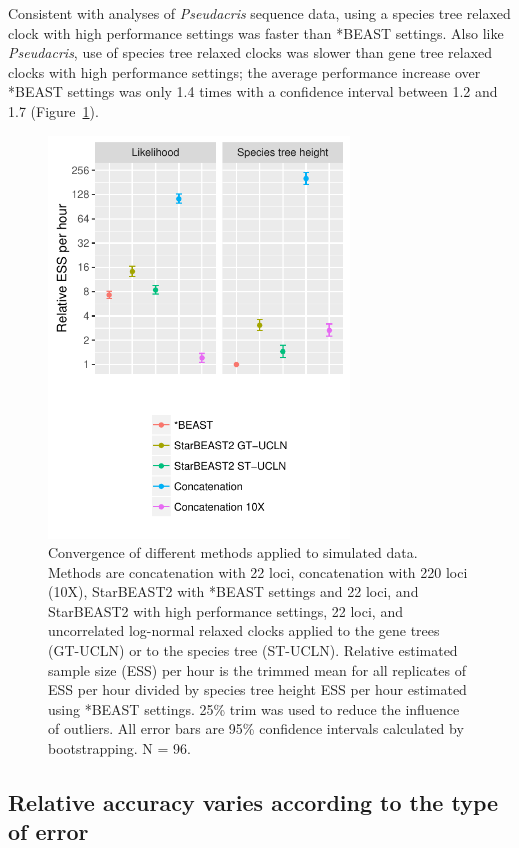 \documentclass[nogrid]{MBE}%
\begin{document}
Consistent with analyses of \textit{Pseudacris} sequence data, using a species
tree relaxed clock with high performance settings was faster than *BEAST settings.
Also like \textit{Pseudacris}, use of species tree relaxed clocks was slower than
gene tree relaxed clocks with high performance settings; the average performance
increase over *BEAST settings was only 1.4 times with a confidence interval
between 1.2 and 1.7 (Figure~\ref{fig:simulatedEssPerHour}).

\begin{figure}[htb!]
\centering
\includegraphics[width=8cm]{multiple_ess_per_hour.pdf}
\caption
{Convergence of different methods applied to simulated data. Methods are
concatenation with 22 loci, concatenation with 220 loci (10X), StarBEAST2 with
*BEAST settings and 22 loci, and StarBEAST2 with high performance settings, 22 loci,
and uncorrelated log-normal relaxed clocks applied to the gene trees (GT-UCLN) or
to the species tree (ST-UCLN). Relative estimated sample size (ESS) per hour is the trimmed mean for all replicates of
ESS per hour divided by species tree height ESS per hour estimated using *BEAST
settings. 25\% trim was used to reduce the influence of
outliers. All error bars are 95\% confidence intervals calculated by
bootstrapping. N = 96.}
\label{fig:simulatedEssPerHour}
\end{figure}

\subsection{Relative accuracy varies according to the type of error}
\end{document}
